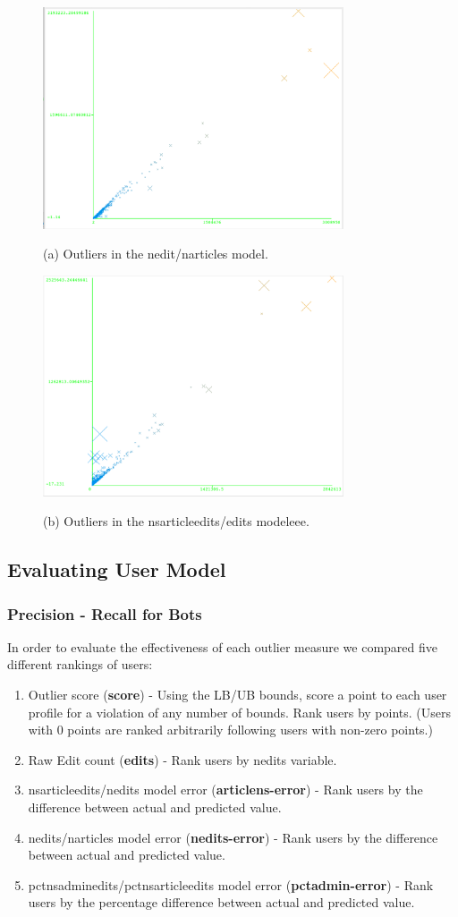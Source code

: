 \documentclass{article}
\begin{document}
\begin{figure}
\centering
\includegraphics[width=3.5in, keepaspectratio = true]{neditserrors.png}
\caption*{(a) Outliers in the nedit/narticles model.}
\includegraphics[width=3.5in, keepaspectratio = true]{articlenseditserrors.png}
\caption*{(b) Outliers in the nsarticleedits/edits modeleee.}
\caption{}
\label{outliers}
\end{figure}

\subsection{Evaluating User Model}
\subsubsection{Precision - Recall for Bots}

In order to evaluate the effectiveness of each outlier measure we compared five different rankings of users:
\begin{enumerate}
\item Outlier score (\textbf{score}) - Using the LB/UB bounds, score a point to each user profile for a violation of any number of bounds. Rank users by points. (Users with 0 points are ranked arbitrarily following users with non-zero points.)
\item Raw Edit count (\textbf{edits}) - Rank users by nedits variable.
\item nsarticleedits/nedits model error (\textbf{articlens-error}) - Rank users by the difference between actual and predicted value.
\item nedits/narticles model error (\textbf{nedits-error}) - Rank users by the difference between actual and predicted value.
\item pctnsadminedits/pctnsarticleedits model error (\textbf{pctadmin-error}) - Rank users by the percentage difference between actual and predicted value.
\end{enumerate}
\end{document}
